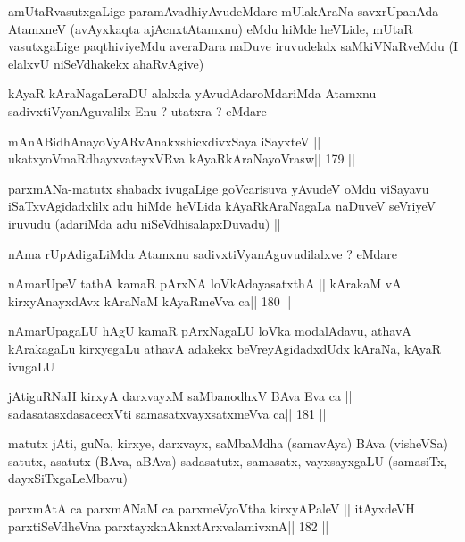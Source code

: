\begin{artha}
amUtaRvasutxgaLige paramAvadhiyAvudeMdare mUlakAraNa savxrUpanAda
AtamxneV (avAyxkaqta ajAcnxtAtamxnu) eMdu hiMde heVLide, mUtaR
vasutxgaLige paqthiviyeMdu averaDara naDuve iruvudelalx saMkiVNaRveMdu
(I elalxvU niSeVdhakekx ahaRvAgive)
\end{artha}

\begin{artha}
kAyaR kAraNagaLeraDU alalxda yAvudAdaroMdariMda Atamxnu
sadivxtiVyanAguvalilx Enu ? utatxra ? eMdare -
\end{artha}

\begin{shl}
mAnABidhAnayoVyARvAnakxshicxdivxSaya iSayxteV ||
ukatxyoVmaRdhayxvateyxVRva kAyaRkAraNayoVrasw\hfill || 179 ||
\end{shl}

\begin{artha}
parxmANa-matutx shabadx ivugaLige goVcarisuva yAvudeV oMdu viSayavu
iSaTxvAgidadxlilx adu hiMde heVLida kAyaRkAraNagaLa naDuveV seVriyeV
iruvudu (adariMda adu niSeVdhisalapxDuvadu) ||
\end{artha}

\begin{artha}
nAma rUpAdigaLiMda Atamxnu sadivxtiVyanAguvudilalxve ? eMdare 
\end{artha}

\begin{shl}
nAmarUpeV tathA kamaR pArxNA loVkAdayasatxthA ||
kArakaM vA kirxyA\s nayxdAvx kAraNaM kAyaRmeVva ca\hfill || 180 ||
\end{shl}

\begin{artha}
nAmarUpagaLU hAgU kamaR pArxNagaLU loVka modalAdavu, athavA kArakagaLu
kirxyegaLu athavA adakekx beVreyAgidadxdUdx kAraNa, kAyaR ivugaLU
\end{artha}

\begin{shl}
jAtiguRNaH kirxyA darxvayxM saMbanodhxV BAva Eva ca ||
sadasatasxdasacecxVti samasatxvayxsatxmeVva ca\hfill || 181 ||
\end{shl}

\begin{artha}
matutx jAti, guNa, kirxye, darxvayx, saMbaMdha (samavAya) BAva
(visheVSa) satutx, asatutx (BAva, aBAva) sadasatutx, samasatx,
vayxsayxgaLU (samasiTx, dayxSiTxgaLeMbavu)
\end{artha}

\begin{shl}
parxmAtA ca parxmANaM ca parxmeVyoV\s tha kirxyAPaleV ||
itAyxdeVH parxtiSeVdheVna parxtayxknAknxtArxvalamivxnA\hfill || 182 ||
\end{shl}

